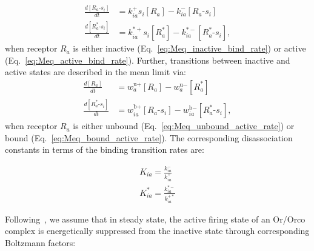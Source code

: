 \documentclass[9pt,twocolumn,twoside,lineno]{pnas-new}
\begin{document}
\begin{align}
\frac{d[R_a\text{-}s_i]}{dt} &= k^+_{ia}s_i[R_a] - k^-_{ia}[R_a\text{-}s_i] \label{eq:Meq_inactive_bind_rate}\\
\frac{d[R^*_a\text{-}s_i]}{dt} &= k^{*+}_{ia}s_i[R^*_a] - k^{*-}_{ia}[R^*_a\text{-}s_i],
\label{eq:Meq_active_bind_rate}
\end{align}
when receptor $R_a$ is either inactive (Eq.~\ref{eq:Meq_inactive_bind_rate}) or active (Eq.~\ref{eq:Meq_active_bind_rate}). Further, transitions between inactive and active states are described in the mean limit via:
\begin{align}
\frac{d[R_a]}{dt} &= w^{\text{u}+}_a [R_a] - w^{\text{u}-}_a [R^*_a] \label{eq:Meq_unbound_active_rate}\\
\frac{d[R^*_a\text{-}s_i]}{dt} &=  w^{\text{b}+}_{ia} [R_a\text{-}s_i] - w^{\text{b}-}_{ia}  [R^*_a\text{-}s_i],
\label{eq:Meq_bound_active_rate}
\end{align}
when receptor $R_a$ is either unbound (Eq.~\ref{eq:Meq_unbound_active_rate}) or bound (Eq.~\ref{eq:Meq_bound_active_rate}). The corresponding disassociation constants in terms of the binding transition rates are:


\begin{align}
K_{ia} = \frac{k^-_{ia}}{k^+_{ia}} \nonumber \\
K^*_{ia} = \frac{k^{*-}_{ia}}{k^{+*}_{ia}} 
\label{eq:Kd}
\end{align}

Following~\cite{srinivas_elife}, we assume that in steady state, the active firing state of an Or/Orco complex is energetically suppressed from the inactive state through corresponding Boltzmann factors:
\end{document}
